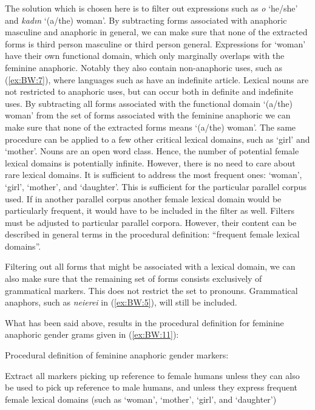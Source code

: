 \documentclass[output=collectionpaper]{langsci/langscibook}
\begin{document}
The solution which is chosen here is to filter out expressions such as  \textit{o} ‘he/she’ and \textit{kadın} ‘(a/the) woman’. By subtracting forms associated with anaphoric masculine and anaphoric in general, we can make sure that none of the extracted forms is third person masculine or third person general. Expressions for ‘woman’ have their own functional domain, which only marginally overlaps with the feminine anaphoric. Notably they also contain non-anaphoric uses, such as (\ref{ex:BW:7}), where languages such as  have an indefinite article. Lexical nouns are not restricted to anaphoric uses, but can occur both in definite and indefinite uses. By subtracting all forms associated with the functional domain ‘(a/the) woman’ from the set of forms associated with the feminine anaphoric we can make sure that none of the extracted forms means ‘(a/the) woman’. The same procedure can be applied to a few other critical lexical domains, such as ‘girl’ and ‘mother’. Nouns are an open word class. Hence, the number of potential female lexical domains is potentially infinite. However, there is no need to care about rare lexical domains. It is sufficient to address the most frequent ones: ‘woman’, ‘girl’, ‘mother’, and ‘daughter’. This is sufficient for the particular parallel corpus used. If in another parallel corpus another female lexical domain would be particularly frequent, it would have to be included in the filter as well. Filters must be adjusted to particular parallel corpora. However, their content can be described in general terms in the procedural definition: “frequent female lexical domains”.

Filtering out all forms that might be associated with a lexical domain, we can also make sure that the remaining set of forms consists exclusively of grammatical markers. This does not restrict the set to pronouns. Grammatical anaphors, such as \textit{neierei} in  (\ref{ex:BW:5}), will still be included.

What has been said above, results in the procedural definition for feminine anaphoric gender grams given in (\ref{ex:BW:11}):

\newpage 
\ea\label{ex:BW:11}
Procedural definition of feminine anaphoric gender markers:\\
\begin{xlist}
\ex Extract all markers picking up reference to female humans
\ex unless they can also be used to pick up reference to male humans, and
\ex unless they express frequent female lexical domains (such as ‘woman’, ‘mother’, ‘girl’, and ‘daughter’)
\end{xlist}
\z
\end{document}
